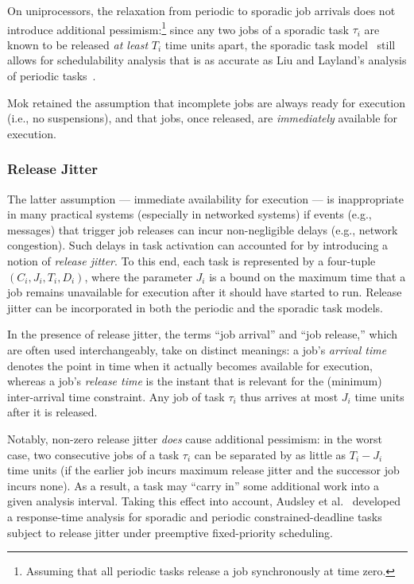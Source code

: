 On uniprocessors, the relaxation from periodic to sporadic job arrivals does not introduce additional pessimism:\footnote{Assuming that all periodic tasks release a job synchronously at time zero.} since any two jobs of a sporadic task $\tau_i$ are  known to be released \emph{at least} $T_i$ time units apart, the sporadic task model~\cite{Mo:83} still allows for schedulability analysis that is as accurate as Liu and Layland's analysis of periodic tasks~\cite{LL:73}. 

Mok retained the assumption that incomplete jobs are always ready for execution (i.e., no suspensions), and that jobs, once released, are \emph{immediately} available for execution. 


\subsubsection{Release Jitter}
\label{sec:jitter}

The latter assumption --- immediate availability for execution --- is inappropriate in many practical systems (especially in networked systems) if events (e.g., messages) that trigger job releases can incur non-negligible delays (e.g., network congestion). Such delays in task activation can accounted for by introducing a notion of \emph{release jitter}. To this end, each task is represented by a four-tuple $(C_i, J_i, T_i, D_i)$, where the parameter $J_i$ is a bound on the maximum time that a job remains unavailable for execution after it should have started to run. Release jitter can be incorporated in both the periodic and the sporadic task models.

In the presence of release jitter, the terms ``job arrival'' and ``job release,'' which are often used interchangeably, take on distinct meanings: a job's \emph{arrival time} denotes the point in time when it actually becomes available for execution, whereas a job's \emph{release time} is the instant that is relevant for the (minimum) inter-arrival time constraint. Any job of task $\tau_i$ thus arrives at most $J_i$ time units after it is released.

Notably, non-zero release jitter \emph{does} cause additional pessimism: in the worst case, two consecutive jobs of a task $\tau_i$ can be separated by as little as $T_i - J_i$ time units (if the earlier job incurs maximum release jitter and the successor job incurs none). As a result, a task may ``carry in'' some additional work into a given analysis interval. Taking this effect into account, Audsley et al.~\cite{ABRTW:93} developed a response-time analysis for sporadic and periodic constrained-deadline tasks subject to release jitter under preemptive fixed-priority scheduling.

